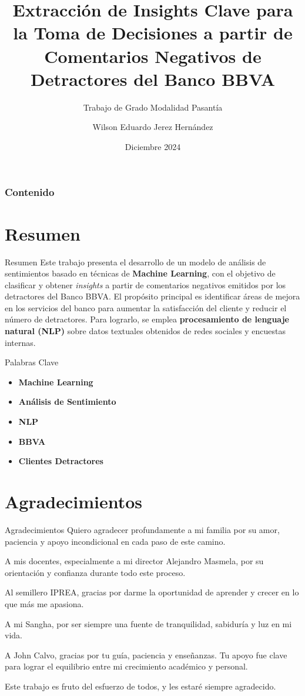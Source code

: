\documentclass[aspectratio=169, xcolor={dvipsnames}, 10pt, spanish]{beamer}
\title[Extracción de Insights Clave para la Toma de Decisiones]{Extracción de Insights Clave para la Toma de Decisiones a partir de Comentarios Negativos de Detractores del Banco BBVA}
\subtitle{Trabajo de Grado Modalidad Pasantía}
\author[Wilson E. Jerez H.]{Wilson Eduardo Jerez Hernández}
\institute[Universidad Distrital]{Universidad Distrital Francisco José de Caldas}
\date{Diciembre 2024}
\begin{document}
\begin{frame}
    \titlepage
\end{frame}

\begin{frame}[t]
    \frametitle{Contenido}
    \begin{multicols}{3}
    \tableofcontents
    \end{multicols}
\end{frame}

\section*{Resumen}
\begin{frame}{Resumen}
    Este trabajo presenta el desarrollo de un modelo de análisis de sentimientos basado en técnicas de \textbf{Machine Learning}, con el objetivo de clasificar y obtener \textit{insights} a partir de comentarios negativos emitidos por los detractores del Banco BBVA. El propósito principal es identificar áreas de mejora en los servicios del banco para aumentar la satisfacción del cliente y reducir el número de detractores. Para lograrlo, se emplea \textbf{procesamiento de lenguaje natural (NLP)} sobre datos textuales obtenidos de redes sociales y encuestas internas.
\end{frame}

\begin{frame}{Palabras Clave}
    \begin{itemize}
        \item \textbf{Machine Learning}
        \item \textbf{Análisis de Sentimiento}
        \item \textbf{NLP}
        \item \textbf{BBVA}
        \item \textbf{Clientes Detractores}
    \end{itemize}
\end{frame}

\section*{Agradecimientos}
\begin{frame}{Agradecimientos}
    Quiero agradecer profundamente a mi familia por su amor, paciencia y apoyo incondicional en cada paso de este camino.

    A mis docentes, especialmente a mi director Alejandro Masmela, por su orientación y confianza durante todo este proceso.

    Al semillero IPREA, gracias por darme la oportunidad de aprender y crecer en lo que más me apasiona.

    A mi Sangha, por ser siempre una fuente de tranquilidad, sabiduría y luz en mi vida.

    A John Calvo, gracias por tu guía, paciencia y enseñanzas. Tu apoyo fue clave para lograr el equilibrio entre mi crecimiento académico y personal.

    Este trabajo es fruto del esfuerzo de todos, y les estaré siempre agradecido.
\end{frame}
\end{document}
